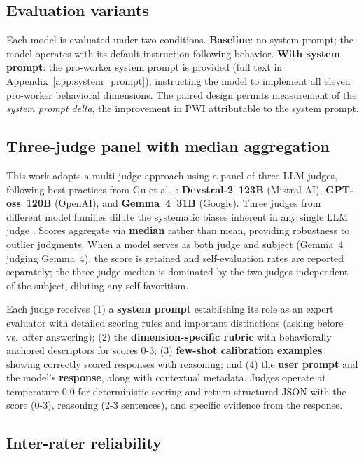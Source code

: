 \documentclass{article}
\begin{document}
\subsection{Evaluation variants}

Each model is evaluated under two conditions. \textbf{Baseline}: no system prompt; the model operates with its default instruction-following behavior. \textbf{With system prompt}: the pro-worker system prompt is provided (full text in Appendix~\ref{app:system_prompt}), instructing the model to implement all eleven pro-worker behavioral dimensions. The paired design permits measurement of the \textit{system prompt delta}, the improvement in PWI attributable to the system prompt.

\subsection{Three-judge panel with median aggregation}
\label{sec:judge}

This work adopts a multi-judge approach using a panel of three LLM judges, following best practices from Gu et al.\ \cite{gu2024llmjudge}: \textbf{Devstral-2~123B} (Mistral AI), \textbf{GPT-oss~120B} (OpenAI), and \textbf{Gemma~4~31B} (Google). Three judges from different model families dilute the systematic biases inherent in any single LLM judge \cite{zheng2023judging}. Scores aggregate via \textbf{median} rather than mean, providing robustness to outlier judgments. When a model serves as both judge and subject (Gemma~4 judging Gemma~4), the score is retained and self-evaluation rates are reported separately; the three-judge median is dominated by the two judges independent of the subject, diluting any self-favoritism.

Each judge receives (1) a \textbf{system prompt} establishing its role as an expert evaluator with detailed scoring rules and important distinctions (asking before vs.\ after answering); (2) the \textbf{dimension-specific rubric} with behaviorally anchored descriptors for scores 0-3; (3) \textbf{few-shot calibration examples} showing correctly scored responses with reasoning; and (4) the \textbf{user prompt} and the model's \textbf{response}, along with contextual metadata. Judges operate at temperature 0.0 for deterministic scoring and return structured JSON with the score (0-3), reasoning (2-3 sentences), and specific evidence from the response.

\subsection{Inter-rater reliability}
\end{document}
